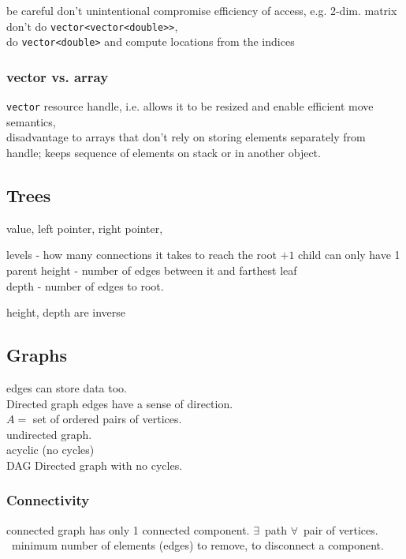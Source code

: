 \documentclass[10pt]{amsart}
\begin{document}
\begin{multicols*}{2}
be careful don't unintentional compromise efficiency of access, e.g. 2-dim. matrix \\
don't do \verb|vector<vector<double>>|, \\
do \verb|vector<double>| and compute locations from the indices 

\subsubsection{vector vs. array}

\verb|vector| resource handle, i.e. allows it to be resized and enable efficient move semantics, \\
disadvantage to arrays that don't rely on storing elements separately from handle; keeps sequence of elements on stack or in another object.

\subsection{Trees}

value, left pointer, right pointer,

levels - how many connections it takes to reach the root $+ 1$
child can only have 1 parent
height - number of edges between it and farthest leaf \\
depth - number of edges to root.

height, depth are inverse

\subsection{Graphs}

edges can store data too. \\
Directed graph edges have a sense of direction. \\
$A =$ set of ordered pairs of vertices. \\
undirected graph. \\
acyclic (no cycles) \\
DAG Directed graph with no cycles.

\subsubsection{Connectivity} 

connected graph has only 1 connected component. $\exists \, $ path $\forall \, $ pair of vertices. \\
\qquad \, minimum number of elements (edges) to remove, to disconnect a component. \\


\end{multicols*}
\end{document}
